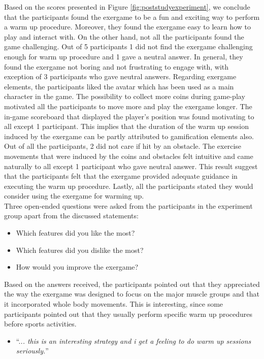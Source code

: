 Based on the scores presented in Figure \ref{fig:poststudyexperiment}, we conclude that the participants found the exergame to be a fun and exciting way to perform a warm up procedure. Moreover, they found the exergame easy to learn how to play and interact with. On the other hand, not all the participants found the game challenging. Out of 5 participants 1 did not find the exergame challenging enough for warm up procedure and 1 gave a neutral answer. In general, they found the exergame not boring and not frustrating to engage with, with exception of 3 participants who gave neutral answers.  Regarding exergame elements, the participants liked the avatar which has been used as a main character in the game. The possibility to collect more coins during game-play motivated all the participants to move more and play the exergame longer. The in-game scoreboard that displayed the player's position was found motivating to all except 1 participant. This implies that the duration of the warm up session induced by the exergame can be partly attributed to gamification elements also. Out of all the participants, 2 did not care if hit by an obstacle. The exercise movements that were induced by the coins and obstacles felt intuitive and came naturally to all except 1 participant who gave neutral answer. This result suggest that the participants felt that the exergame provided adequate guidance in executing the warm up procedure. Lastly, all the participants stated they would consider using the exergame for warming up. \\Three open-ended questions were asked from the participants in the experiment group apart from the discussed statements:
\begin{itemize}
 \item Which features did you like the most?
 \item Which features did you dislike the most?
 \item How would you improve the exergame?
\end{itemize}
Based on the answers received, the participants pointed out that they appreciated the way the exergame was designed to focus on the major muscle groups and that it incorporated whole body movements. This is interesting, since some participants pointed out that they usually perform specific warm up procedures before sports activities.
\begin{itemize}
\item ``.\textit{.. this is an interesting strategy and i get a feeling to do warm up sessions seriously.}''
\end{itemize}
